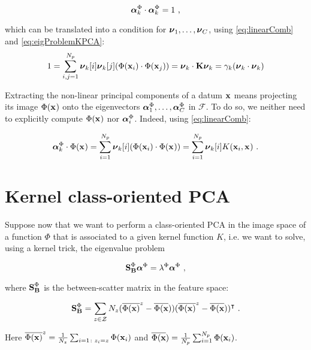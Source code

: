 \begin{equation}
\boldsymbol{\alpha}^\Phi_k\cdot\boldsymbol{\alpha}^\Phi_k = 1 \mbox{ ,}
\end{equation}

which can be translated into a condition for $\boldsymbol{\nu}_1,\dots, \boldsymbol{\nu}_C$, using \eqref{eq:linearComb} and \eqref{eq:eigProblemKPCA}:
\begin{equation}
1 = \sum_{i,j=1}^{N_p}\boldsymbol{\nu}_k[i]\boldsymbol{\nu}_k[j](\Phi(\textbf{x}_{i})\cdot \Phi(\textbf{x}_{j})) = \boldsymbol{\nu}_k \cdot \textbf{K}\boldsymbol{\nu}_k = \gamma_k(\boldsymbol{\nu}_k\cdot \boldsymbol{\nu}_k)
\end{equation}


Extracting the non-linear principal components of a datum $\textbf{x}_{}$ means projecting its image $\Phi(\textbf{x}_{})$ onto the eigenvectors $\boldsymbol{\alpha}^\Phi_1,\dots, \boldsymbol{\alpha}^\Phi_C$ in $\mathcal{F}$. To do so, we neither need to explicitly compute $\Phi(\textbf{x}_{})$ nor $\boldsymbol{\alpha}^\Phi_i$. Indeed, using \eqref{eq:linearComb}:

\begin{equation}
\boldsymbol{\alpha}^\Phi_k \cdot \Phi(\textbf{x}_{}) = \sum_{i=1}^{N_p}\boldsymbol{\nu}_k[i](\Phi(\textbf{x}_{i}) \cdot \Phi(\textbf{x}_{})) =  \sum_{i=1}^{N_p}\boldsymbol{\nu}_k[i]K(\textbf{x}_{i}, \textbf{x}_{}) \mbox{ .}
\end{equation}



\section{Kernel class-oriented PCA}

Suppose now that we want to perform a class-oriented PCA in the image space of a function $\Phi$ that is associated to a given kernel function $K$, i.e. we want to solve, using a kernel trick, the eigenvalue problem


\begin{equation}\label{eq:eigProblemSB}
\textbf{S}_{\textbf{B}}^\Phi\boldsymbol{\alpha}^\Phi = \lambda^\Phi \boldsymbol{\alpha}^\Phi \mbox{ ,}
\end{equation}

where $\textbf{S}_{\textbf{B}}^\Phi$ is the between-scatter matrix in the feature space: 

\begin{equation}
\textbf{S}_{\textbf{B}}^\Phi = \sum_{z\in\mathcal{Z}}N_z(\overline{\Phi(\textbf{x})}^{z}-\overline{\Phi(\textbf{x}}))(\overline{\Phi(\textbf{x})}^{z}-\overline{\Phi(\textbf{x}}))^\intercal \mbox{ .}
\end{equation}

Here $\overline{\Phi(\textbf{x})}^{z} = \frac{1}{N_z}\sum_{i=1\colon z_i=z}\Phi(\textbf{x}_{i})$ and $\overline{\Phi(\textbf{x}}) = \frac{1}{N_p}\sum_{i=1}^{N_p}\Phi(\textbf{x}_{i})$.\\

